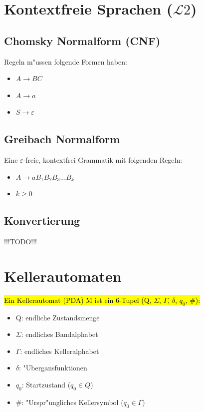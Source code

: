 \documentclass[11pt, a4paper]{scrartcl}
\begin{document}
\newpage


\section{Kontextfreie Sprachen ($\mathcal{L}2 $)}

\subsection{Chomsky Normalform (CNF)}

Regeln m"ussen folgende Formen haben:

\begin{itemize}
    \item $A \rightarrow BC$
    \item $A \rightarrow a$
    \item $S \rightarrow \varepsilon$
\end{itemize}

\subsection{Greibach Normalform}

Eine $\varepsilon$-freie, kontextfrei Grammatik mit folgenden Regeln:

\begin{itemize}
    \item $A \rightarrow aB_1B_2B_3...B_k$
    \item $k \geq 0$
\end{itemize}

\subsection{Konvertierung}

!!!TODO!!!

\newpage


\section{Kellerautomaten}

\hl{Ein Kellerautomat (PDA) M ist ein 6-Tupel (Q, $\Sigma$, $\Gamma$, $\delta$, $q_0$, $\#$):}

\begin{itemize}
    \item Q: endliche Zustandsmenge
    \item $\Sigma$: endliches Bandalphabet
    \item $\Gamma$: endliches Kelleralphabet
    \item $\delta$: "Ubergansfunktionen
    \item $q_0$: Startzustand ($q_0 \in Q$)
    \item $\#$: "Urspr"ungliches Kellersymbol ($q_0 \in \Gamma$)
\end{itemize}
\end{document}
